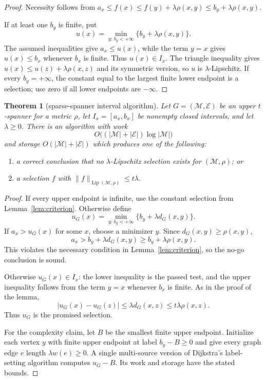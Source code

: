 \documentclass[11pt]{article}
\newtheorem{theorem}{Theorem}
\newcommand{\M}{\mathcal M}
\newcommand{\E}{\mathcal E}
\newcommand{\Lip}{\operatorname{Lip}}
\begin{document}
\begin{proof}
Necessity follows from
$a_x\le f(x)\le f(y)+\lambda\rho(x,y)\le
b_y+\lambda\rho(x,y)$.

If at least one $b_y$ is finite, put
\[
 u(x)=\min_{y:\,b_y<+\infty}\{b_y+\lambda\rho(x,y)\}.
\]
The assumed inequalities give $a_x\le u(x)$, while the term $y=x$ gives
$u(x)\le b_x$ whenever $b_x$ is finite. Thus $u(x)\in I_x$. The triangle
inequality gives $u(x)\le u(z)+\lambda\rho(x,z)$ and its symmetric version,
so $u$ is $\lambda$-Lipschitz. If every $b_y=+\infty$, the constant equal to
the largest finite lower endpoint is a selection; use zero if all lower
endpoints are $-\infty$.
\end{proof}

\begin{theorem}[sparse-spanner interval algorithm]\label{thm:graph}
Let $G=(\M,\E)$ be an upper $t$-spanner for a metric $\rho$, let
$I_x=[a_x,b_x]$ be nonempty closed intervals, and let $\lambda\ge0$. There is
an algorithm with work
\[
 O\bigl((|\M|+|\E|)\log |\M|\bigr)
\]
and storage $O(|\M|+|\E|)$ which produces one of the following:

\begin{enumerate}[label=(\roman*)]
\item a correct conclusion that no $\lambda$-Lipschitz selection exists for
$(\M,\rho)$; or
\item a selection $f$ with $\|f\|_{\Lip(\M,\rho)}\le t\lambda$.
\end{enumerate}
\end{theorem}

\begin{proof}
If every upper endpoint is infinite, use the constant selection from
Lemma~\ref{lem:criterion}. Otherwise define
\[
 u_G(x)=\min_{y:\,b_y<+\infty}\{b_y+\lambda d_G(x,y)\}.
\]
If $a_x>u_G(x)$ for some $x$, choose a minimizer $y$. Since
$d_G(x,y)\ge\rho(x,y)$,
\[
 a_x>b_y+\lambda d_G(x,y)
       \ge b_y+\lambda\rho(x,y).
\]
This violates the necessary condition in Lemma~\ref{lem:criterion}, so the
no-go conclusion is sound.

Otherwise $u_G(x)\in I_x$: the lower inequality is the passed test, and the
upper inequality follows from the term $y=x$ whenever $b_x$ is finite. As in
the proof of the lemma,
\[
 |u_G(x)-u_G(z)|\le\lambda d_G(x,z)
                    \le t\lambda\rho(x,z).
\]
Thus $u_G$ is the promised selection.

For the complexity claim, let $B$ be the smallest finite upper endpoint.
Initialize each vertex $y$ with finite upper endpoint at label $b_y-B\ge0$
and give every graph edge $e$ length $\lambda w(e)\ge0$. A single
multi-source version of Dijkstra's label-setting algorithm \cite{Dijkstra}
computes $u_G-B$. Its work and storage have the stated bounds.
\end{proof}
\end{document}
